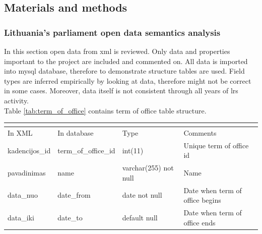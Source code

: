 \documentclass[a4paper,12pt]{article}
\begin{document}
		
	
	
	\clearpage
	
	\subsection{Materials and methods}
   	
 	\subsubsection{Lithuania's parliament open data semantics analysis }
 	
 	In this section open data from \acrshort{xml} is reviewed. Only data and properties important to the project are included and commented on. All data is imported into \gls{mysql} database, therefore to demonstrate structure tables are used. Field types are inferred empirically by looking at data, therefore might not be correct in some cases. Moreover, data itself is not consistent through all years of \acrlong{lrs} activity.\\
	
	\noindent
	Table \ref{tab:term_of_office} contains term of office table structure.
	\begin{center}
	 	\begin{tabular}{L{3cm} L{3cm} L{2.2cm} L{3.8cm}}
	 		\\ 
	 		\hline
	 		In XML & In database & Type & Comments\\
	 		\hline 
	 		kadencijos\_id & term\_of\_office\_id & int(11) & Unique term of office id \\ 
	 		pavadinimas & name & varchar(255) not null & Name \\
	 		data\_nuo & date\_from & date not null & Date when term of office begins \\ 
	 		data\_iki & date\_to & default null & Date when term of office ends \\
	 		\hline
	 	\end{tabular}
	 	 \label{tab:term_of_office}
	\end{center}

	\hfill
	
\end{document}
